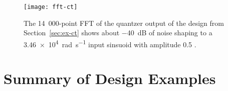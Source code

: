 \begin{figure}
	\centering
	\texttt{[image: fft-ct]}
	\caption{The 14~000-point FFT of the quantzer output of the  design from Section~\ref{sec:ex-ct} shows about \SI{-40}{\deci\bel} of noise shaping to a \SI{3.46e4}{\radian\per\second} input sinsuoid with amplitude 0.5 .} \label{fig:fft-ct}
\end{figure}

\section{Summary of Design Examples}
\label{sec:ex-compare}

